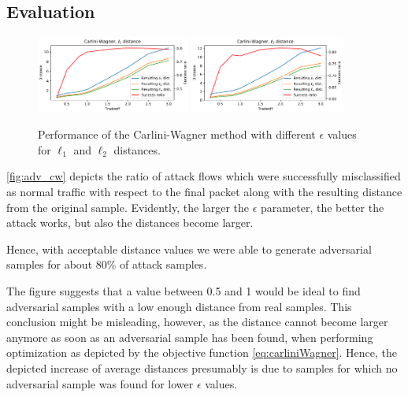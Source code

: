 \documentclass[sigconf,nonacm]{acmart}
\begin{document}
\subsection{Evaluation}
\begin{figure}
\includegraphics[width=0.45\textwidth]{adv_plots/cwl1.pdf}
\includegraphics[width=0.45\textwidth]{adv_plots/cwl2.pdf}
\caption{Performance of the Carlini-Wagner method with different $\epsilon$ values for $\ell_1$ and $\ell_2$ distances.}
\label{fig:adv_cw}
\end{figure}
\autoref{fig:adv_cw} depicts the ratio of attack flows which were successfully misclassified as normal traffic with respect to the final packet along with the resulting distance from the original sample. Evidently, the larger the $\epsilon$ parameter, the better the attack works, but also the distances become larger. 

Hence, with acceptable distance values we were able to generate adversarial samples for about 80\% of attack samples.

The figure suggests that a value between 0.5 and 1 would be ideal to find adversarial samples with a low enough distance from real samples. This conclusion might be misleading, however, as the distance cannot become larger anymore as soon as an adversarial sample has been found, when performing optimization as depicted by the objective function \eqref{eq:carliniWagner}. Hence, the depicted increase of average distances presumably is due to samples for which no adversarial sample was found for lower $\epsilon$ values.
\end{document}

